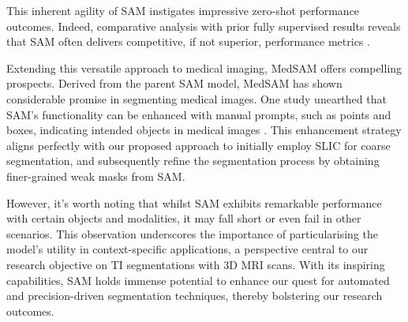This inherent agility of SAM instigates impressive zero-shot performance outcomes. Indeed, comparative analysis with prior fully supervised results reveals that SAM often delivers competitive, if not superior, performance metrics \cite{kirillov2023segany}.

Extending this versatile approach to medical imaging, MedSAM offers compelling prospects. Derived from the parent SAM model, MedSAM has shown considerable promise in segmenting medical images. One study unearthed that SAM's functionality can be enhanced with manual prompts, such as points and boxes, indicating intended objects in medical images \cite{huang2023segment}. This enhancement strategy aligns perfectly with our proposed approach to initially employ SLIC for coarse segmentation, and subsequently refine the segmentation process by obtaining finer-grained weak masks from SAM.

However, it's worth noting that whilst SAM exhibits remarkable performance with certain objects and modalities, it may fall short or even fail in other scenarios. This observation underscores the importance of particularising the model's utility in context-specific applications, a perspective central to our research objective on TI segmentations with 3D MRI scans. With its inspiring capabilities, SAM holds immense potential to enhance our quest for automated and precision-driven segmentation techniques, thereby bolstering our research outcomes.












